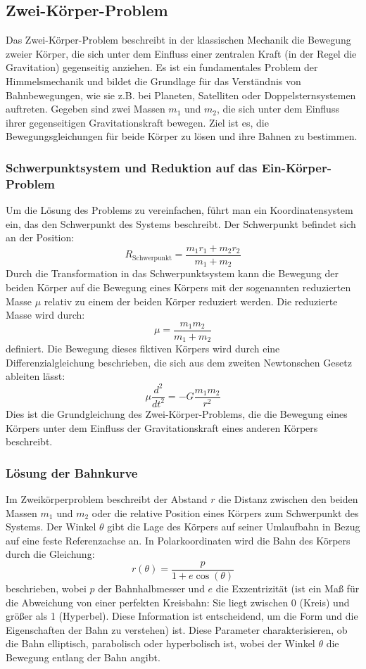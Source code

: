 \documentclass[a4paper,12pt,twoside]{article}
\begin{document}
\subsection{Zwei-Körper-Problem}

Das Zwei-Körper-Problem beschreibt in der klassischen Mechanik die Bewegung zweier Körper, die sich unter dem Einfluss einer zentralen Kraft (in der Regel die Gravitation) gegenseitig anziehen. Es ist ein fundamentales Problem der Himmelsmechanik und bildet die Grundlage für das Verständnis von Bahnbewegungen, wie sie z.B. bei Planeten, Satelliten oder Doppelsternsystemen auftreten.
Gegeben sind zwei Massen \( m_1 \) und \( m_2 \), die sich unter dem Einfluss ihrer gegenseitigen Gravitationskraft bewegen.
Ziel ist es, die Bewegungsgleichungen für beide Körper zu lösen und ihre Bahnen zu bestimmen.
\subsubsection{Schwerpunktsystem und Reduktion auf das Ein-Körper-Problem}
Um die Lösung des Problems zu vereinfachen, führt man ein Koordinatensystem ein, das den Schwerpunkt des Systems beschreibt. Der Schwerpunkt befindet sich an der Position:
\[
R_{\text{Schwerpunkt}} = \frac{m_1 r_1 + m_2 r_2}{m_1 + m_2}
\]
Durch die Transformation in das Schwerpunktsystem kann die Bewegung der beiden Körper auf die Bewegung eines Körpers mit der sogenannten reduzierten Masse \( \mu \) relativ zu einem der beiden Körper reduziert werden. Die reduzierte Masse wird durch:
\[
\mu = \frac{m_1 m_2}{m_1 + m_2}
\]
definiert. Die Bewegung dieses fiktiven Körpers wird durch eine Differenzialgleichung beschrieben, die sich aus dem zweiten Newtonschen Gesetz ableiten lässt:
\[
\mu \frac{d^2}{dt^2} = - G \frac{m_1 m_2}{r^2} 
\]
Dies ist die Grundgleichung des Zwei-Körper-Problems, die die Bewegung eines Körpers unter dem Einfluss der Gravitationskraft eines anderen Körpers beschreibt.


\subsubsection{Lösung der Bahnkurve}
Im Zweikörperproblem beschreibt der Abstand \( r \) die Distanz zwischen den beiden Massen \( m_1 \) und \( m_2 \) oder die relative Position eines Körpers zum Schwerpunkt des Systems. Der Winkel \( \theta \) gibt die Lage des Körpers auf seiner Umlaufbahn in Bezug auf eine feste Referenzachse an. In Polarkoordinaten wird die Bahn des Körpers durch die Gleichung:
\[
r(\theta) = \frac{p}{1 + e \cos(\theta)}
\]
beschrieben, wobei \( p \) der Bahnhalbmesser und \( e \) die Exzentrizität (ist ein Maß für die Abweichung von einer perfekten Kreisbahn: Sie liegt zwischen 0 (Kreis) und größer als 1 (Hyperbel). Diese Information ist entscheidend, um die Form und die Eigenschaften der Bahn zu verstehen) ist. Diese Parameter charakterisieren, ob die Bahn elliptisch, parabolisch oder hyperbolisch ist, wobei der Winkel \( \theta \) die Bewegung entlang der Bahn angibt.
\end{document}
